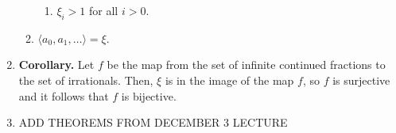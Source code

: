 \documentclass[11pt]{article}
\theoremstyle{definition}
\theoremstyle{named}
\begin{document}
\begin{enumerate}
\begin{enumerate}
\begin{enumerate}
            \item $\xi_i>1$ for all $i>0$. 
        \end{enumerate} 
        \item $\langle a_0,a_1,\dots \rangle = \xi$. 
    \end{enumerate}
    \item \textbf{Corollary. } Let $f$ be the map from the set of infinite continued fractions to the set of irrationals. Then, $\xi$ is in the image of the map $f$, so $f$ is surjective and it follows that $f$ is bijective. 
    \item ADD THEOREMS FROM DECEMBER 3 LECTURE
\end{enumerate}
\end{document}
